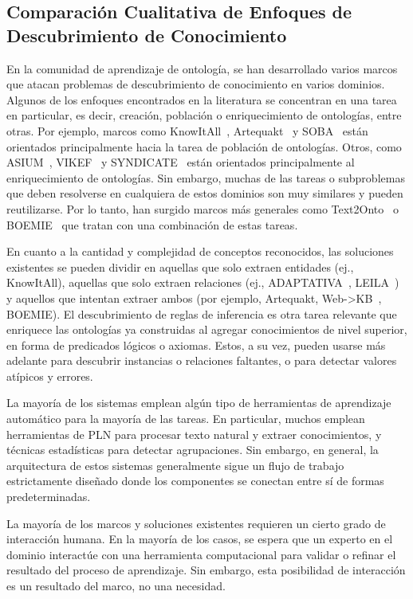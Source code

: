 \subsection{Comparación Cualitativa de Enfoques de Descubrimiento de Conocimiento}

En la comunidad de aprendizaje de ontología, se han desarrollado varios marcos que atacan problemas de descubrimiento de conocimiento en varios dominios.
Algunos de los enfoques encontrados en la literatura se concentran en una tarea en particular, es decir, creación, población o enriquecimiento de ontologías, entre otras.
Por ejemplo, marcos como KnowItAll~\cite{knowitall}, Artequakt~\cite{artequakt} y SOBA~\cite{soba} están orientados principalmente hacia la tarea de población de ontologías.
Otros, como ASIUM~\cite{asium}, VIKEF~\cite{vikef} y SYNDICATE~\cite{syndikate} están orientados principalmente al enriquecimiento de ontologías.
Sin embargo, muchas de las tareas o subproblemas que deben resolverse en cualquiera de estos dominios son muy similares y pueden reutilizarse.
Por lo tanto, han surgido marcos más generales como Text2Onto~\cite{cimiano2005text2onto} o BOEMIE~\cite{boemie} que tratan con una combinación de estas tareas.

En cuanto a la cantidad y complejidad de conceptos reconocidos, las soluciones existentes se pueden dividir en aquellas que solo extraen entidades (ej., KnowItAll), aquellas que solo extraen relaciones (ej., ADAPTATIVA~\cite{adaptativa}, LEILA~\cite{leila}) y aquellos que intentan extraer ambos (por ejemplo, Artequakt, Web->KB~\cite{webkb}, BOEMIE).
El descubrimiento de reglas de inferencia es otra tarea relevante que enriquece las ontologías ya construidas al agregar conocimientos de nivel superior, en forma de predicados lógicos o axiomas.
Estos, a su vez, pueden usarse más adelante para descubrir instancias o relaciones faltantes, o para detectar valores atípicos y errores.

La mayoría de los sistemas emplean algún tipo de herramientas de aprendizaje automático para la mayoría de las tareas.
En particular, muchos emplean herramientas de PLN para procesar texto natural y extraer conocimientos, y técnicas estadísticas para detectar agrupaciones.
Sin embargo, en general, la arquitectura de estos sistemas generalmente sigue un flujo de trabajo estrictamente diseñado donde los componentes se conectan entre sí de formas predeterminadas.

La mayoría de los marcos y soluciones existentes requieren un cierto grado de interacción humana. En la mayoría de los casos, se espera que un experto en el dominio interactúe con una herramienta computacional para validar o refinar el resultado del proceso de aprendizaje.
Sin embargo, esta posibilidad de interacción es un resultado del marco, no una necesidad.

